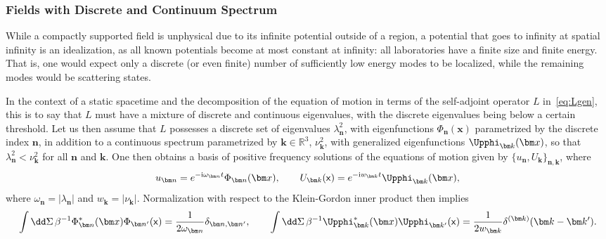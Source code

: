 \documentclass[letterpaper,12pt,titlepage,oneside,final]{book}
\newcommand{\mf}{\mathsf}%
\newcommand{\ii}{\mathrm{i}}
\begin{document}
\subsubsection*{Fields with Discrete and Continuum Spectrum}

While a compactly supported field is unphysical due to its infinite potential outside of a region, a potential that goes to infinity at spatial infinity is an idealization, as all known potentials become at most constant at infinity: all laboratories have a finite size and finite energy. That is, one would expect only a discrete (or even finite) number of sufficiently low energy modes to be localized, while the remaining modes would be scattering states. 

In the context of a static spacetime and the decomposition of the equation of motion in terms of the self-adjoint operator $L$ in~\eqref{eq:Lgen}, this is to say that $L$ must have a mixture of discrete and continuous eigenvalues, with the discrete eigenvalues being below a certain threshold. Let us then assume that $L$ possesses a discrete set of eigenvalues $\lambda_{\bm n}^2$, with eigenfunctions $\Phi_{\bm n}(\bm x)$ parametrized by the discrete index $\bm n$, in addition to a continuous spectrum parametrized by $\bm k\in \mathbb{R}^3$, $\nu_{\bm k}^2$, with generalized eigenfunctions $\Upphi_{\bm k}(\bm x)$, so that $\lambda_{\bm n}^2<\nu_{\bm k}^2$ for all $\bm n$ and $\bm k$. One then obtains a basis of positive frequency solutions of the equations of motion given by $\{u_{\bm n},U_{\bm k}\}_{\bm n, \bm k}$, where
\begin{equation}
    u_{\bm n} = e^{- \ii \omega_{\bm n} t}\Phi_{\bm n}(\bm x), \quad \quad U_{\bm k}(\mf x) = e^{- \ii w_{\bm k}t}\Upphi_{\bm k}(\bm x),
\end{equation}
where $\omega_{\bm n} = |\lambda_{\bm n}|$ and $w_{\bm k} = |\nu_{\bm k}|$. Normalization with respect to the Klein-Gordon inner product then implies
\begin{equation}
    \int \dd \Sigma \,\beta^{-1}\Phi_{\bm n}^*(\bm x) \Phi_{\bm n'}(\mf x) = \frac{1}{2\omega_{\bm n}}\delta_{\bm n, \bm n'}, \quad \quad \int \dd \Sigma \,\beta^{-1} \Upphi_{\bm k}^*(\bm x) \Upphi_{\bm k'}(\mf x) = \frac{1}{2w_{\bm k}}\delta^{(\bm k)}(\bm k - \bm k').
\end{equation}
\end{document}
